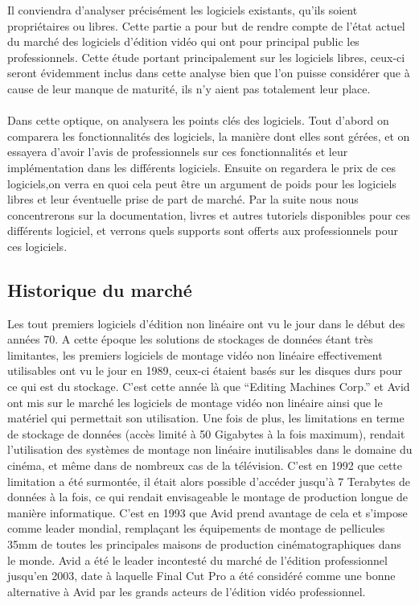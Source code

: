 Il conviendra d'analyser précisément les logiciels existants, qu'ils soient
propriétaires ou libres. Cette partie a pour but de rendre compte de
l'état actuel du marché des logiciels d'édition vidéo qui ont pour principal
public les professionnels. Cette étude portant principalement
sur les logiciels libres, ceux-ci seront évidemment inclus dans cette analyse
bien que l'on puisse considérer que à cause de leur manque de maturité, ils
n'y aient pas totalement leur place.

\paragraph{}

Dans cette optique, on analysera les points clés des logiciels.
Tout d'abord on comparera les fonctionnalités des
logiciels, la manière dont elles sont gérées, et on essayera d'avoir l'avis de
professionnels sur ces fonctionnalités et leur implémentation dans les différents
logiciels. Ensuite on regardera le prix de ces logiciels,on verra en quoi cela
peut être un argument de poids pour les logiciels libres et leur éventuelle
prise de part de marché. Par la suite nous nous concentrerons sur la documentation,
livres et autres tutoriels disponibles pour ces différents logiciel, et verrons
quels supports sont offerts aux professionnels pour ces logiciels.

\subsection {Historique du marché}

Les tout premiers logiciels d'édition non linéaire ont vu le jour dans le début des années 70.
A cette époque les solutions de stockages de données étant très limitantes, les premiers logiciels de montage
vidéo non linéaire effectivement utilisables ont vu le jour en 1989, ceux-ci étaient basés sur les disques durs
pour ce qui est du stockage. C'est cette année là que ``Editing Machines Corp.'' et Avid ont mis sur le
marché les logiciels de montage vidéo non linéaire ainsi que le matériel qui permettait son
utilisation. Une fois de plus, les limitations en terme de stockage de données (accès limité à 50 Gigabytes
à la fois maximum), rendait l'utilisation des systèmes de montage non linéaire inutilisables dans le domaine
du cinéma, et même dans de nombreux cas de la télévision. C'est en 1992 que cette limitation a été surmontée,
il était alors possible d'accéder jusqu'à 7 Terabytes de données à la fois, ce qui rendait envisageable le montage
de production longue de manière informatique. C'est en 1993 que Avid prend avantage de cela et s'impose
comme leader mondial, remplaçant les équipements de montage de pellicules 35mm de toutes les principales maisons
de production cinématographiques dans le monde. Avid a été le leader incontesté du marché de l'édition
professionnel jusqu'en 2003, date à laquelle Final Cut Pro a été considéré comme une bonne alternative
à Avid par les grands acteurs de l'édition vidéo professionnel.

